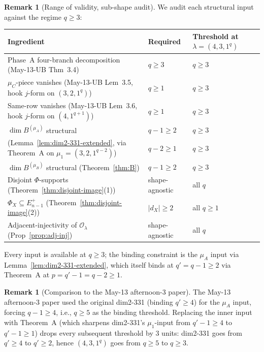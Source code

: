 \documentclass[11pt]{article}
\theoremstyle{definition}
\newtheorem{remark}[theorem]{Remark}
\begin{document}
\begin{remark}[Range of validity, sub-shape audit]\label{rem:audit}
We audit each structural input against the regime $q \ge 3$:
\begin{center}
\renewcommand{\arraystretch}{1.15}
\begin{tabular}{lll}
\toprule
Ingredient & Required & Threshold at $\lambda = (4, 3, 1^q)$ \\
\midrule
Phase~A four-branch decomposition (May-13-UB Thm~3.4) & $q \ge 3$ & $q \ge 3$ \\
$\mu_C$-piece vanishes (May-13-UB Lem~3.5, hook $j$-form on $(3, 2, 1^q)$) & $q \ge 1$ & $q \ge 3$ \\
Same-row vanishes (May-13-UB Lem~3.6, hook $j$-form on $(4, 1^{q+1})$) & $q \ge 1$ & $q \ge 3$ \\
$\dim B^{(\mu_A)}$ structural & $q - 1 \ge 2$ & $q \ge 3$ \\
\hspace{1em} (Lemma~\ref{lem:dim2-331-extended}, via Theorem~A on $\mu_1 = (3,2,1^{q-2})$) & $q - 2 \ge 1$ & $q \ge 3$ \\
$\dim B^{(\mu_B)}$ structural (Theorem~\ref{thm:B}) & $q - 1 \ge 2$ & $q \ge 3$ \\
Disjoint $\Phi$-supports (Theorem~\ref{thm:disjoint-image}(1)) & shape-agnostic & all $q$ \\
$\Phi_X \subseteq E_{n-1}^+$ (Theorem~\ref{thm:disjoint-image}(2)) & $|d_X| \ge 2$ & all $q \ge 1$ \\
Adjacent-injectivity of $\mathcal{O}_\lambda$ (Prop~\ref{prop:adj-inj}) & shape-agnostic & all $q$ \\
\bottomrule
\end{tabular}
\end{center}
Every input is available at $q \ge 3$; the binding constraint is the
$\mu_A$ input via Lemma~\ref{lem:dim2-331-extended}, which itself
binds at $q' = q - 1 \ge 2$ via Theorem~A at $p = q' - 1 = q - 2 \ge 1$.
\end{remark}

\begin{remark}[Comparison to the May-13 afternoon-3 paper]\label{rem:vs-afternoon-3}
The May-13 afternoon-3 paper used the original dim2-331 (binding
$q' \ge 4$) for the $\mu_A$ input, forcing $q - 1 \ge 4$, i.e.,
$q \ge 5$ as the binding threshold. Replacing the inner input with
Theorem~A (which sharpens dim2-331's $\mu_1$-input from $q' - 1 \ge 4$
to $q' - 1 \ge 1$) drops every subsequent threshold by $3$ units:
dim2-331 goes from $q' \ge 4$ to $q' \ge 2$, hence $(4, 3, 1^q)$ goes
from $q \ge 5$ to $q \ge 3$.
\end{remark}
\end{document}
